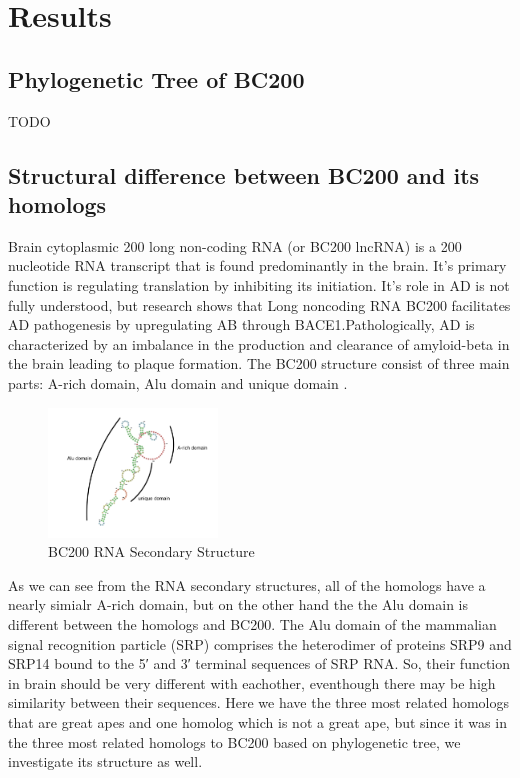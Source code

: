 \documentclass[conference]{IEEEtran}
\begin{document}
\section{Results}\label{sec:results}

\subsection{Phylogenetic Tree of BC200}
TODO

\subsection{Structural difference between BC200 and its homologs}

Brain cytoplasmic 200 long non-coding RNA (or BC200 lncRNA) is a 200 nucleotide RNA transcript that is found predominantly in the brain. It's primary function is regulating translation by inhibiting its initiation.
It's role in AD is not fully understood, but research shows that Long noncoding RNA BC200 facilitates AD pathogenesis by upregulating AB through BACE1.Pathologically, AD is characterized by an imbalance in the production and clearance of amyloid-beta in the brain leading to plaque formation.\cite{li2018identification}
The BC200 structure consist of three main parts: A-rich domain, Alu domain and unique domain \cite{jung2014rna}.
\begin{figure}
  \centering
  \includegraphics[width=0.4\textwidth]{figs/rna-6.png}
  \caption{BC200 RNA Secondary Structure}
\end{figure}
As we can see from the RNA secondary structures, all of the homologs have a nearly simialr A-rich domain, but on the other hand the the Alu domain is different between the homologs and BC200. The Alu domain of the mammalian signal recognition particle (SRP) comprises the heterodimer of proteins SRP9 and SRP14 bound to the 5′ and 3′ terminal sequences of SRP RNA\cite{weichenrieder2000structure}. So, their function in brain should be very different with eachother, eventhough there may be high similarity between their sequences. Here we have the three most related homologs that are great apes and one homolog which is not a great ape, but since it was in the three most related homologs to BC200 based on phylogenetic tree, we investigate its structure as well.
\end{document}
